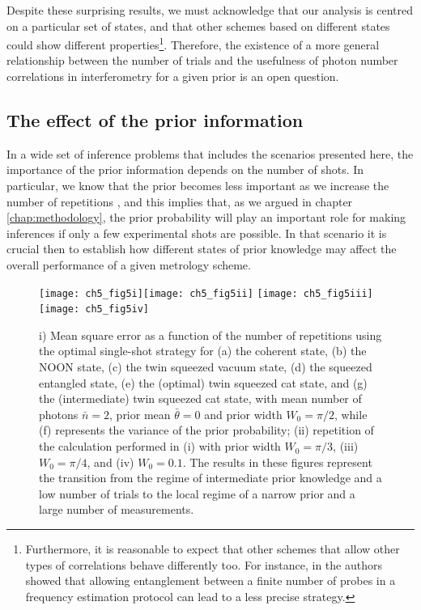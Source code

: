 Despite these surprising results, we must acknowledge that our analysis is centred on a particular set of states, and that other schemes based on different states could show different properties\footnote{Furthermore, it is reasonable to expect that other schemes that allow other types of correlations behave differently too. For instance, in \cite{smirne2018} the authors showed that allowing entanglement between a finite number of probes in a frequency estimation protocol can lead to a less precise strategy.}. Therefore, the existence of a more general relationship between the number of trials and the usefulness of photon number correlations in interferometry for a given prior is an open question. 

\subsection{The effect of the prior information}
\label{prior_section}

In a wide set of inference problems that includes the scenarios presented here, the importance of the prior information depends on the number of shots. In particular, we know that the prior becomes less important as we increase the number of repetitions \cite{cox2000}, and this implies that, as we argued in chapter \ref{chap:methodology}, the prior probability will play an important role for making inferences if only a few experimental shots are possible. In that scenario it is crucial then to establish how different states of prior knowledge may affect the overall performance of a given metrology scheme.

\begin{figure}[t]
\centering
\texttt{[image: ch5\_fig5i]}\texttt{[image: ch5\_fig5ii]}
\texttt{[image: ch5\_fig5iii]}\texttt{[image: ch5\_fig5iv]}
	\caption[Prior information and the transition between local regimes]{i) Mean square error as a function of the number of repetitions using the optimal single-shot strategy for (a) the coherent state, (b) the NOON state, (c) the twin squeezed vacuum state, (d) the squeezed entangled state, (e) the (optimal) twin squeezed cat state, and (g) the (intermediate) twin squeezed cat state, with mean number of photons $\bar{n}=2$, prior mean $\bar{\theta} = 0$ and prior width $W_0 = \pi/2$, while (f) represents the variance of the prior probability; (ii) repetition of the calculation performed in (i) with prior width $W_0=\pi/3$, (iii) $W_0=\pi/4$, and (iv) $W_0=0.1$. The results in these figures represent the transition from the regime of intermediate prior knowledge and a low number of trials to the local regime of a narrow prior and a large number of measurements.}
\label{prior_figure}
\end{figure}

